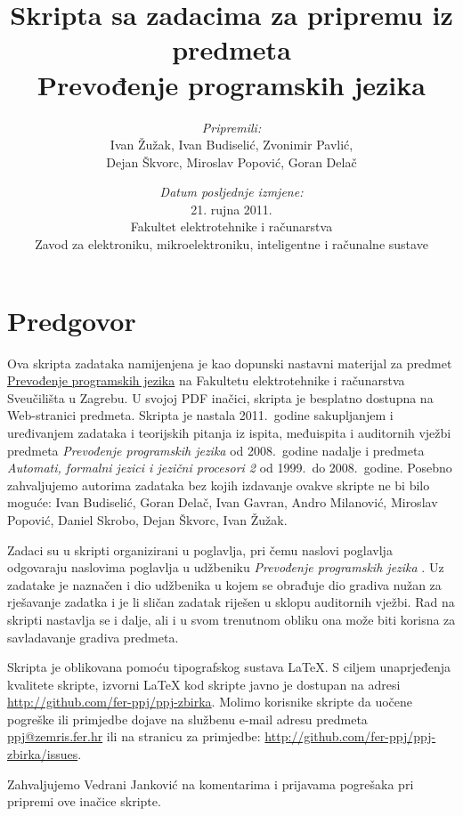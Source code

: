\documentclass[times, 12pt, utf8]{book}
\title{
\vfill
Skripta sa zadacima za pripremu iz predmeta \\
Prevođenje programskih jezika \\
\vspace{70pt}
}
\author{
\emph{Pripremili:} \\
Ivan Žužak, Ivan Budiselić, Zvonimir Pavlić, \\
Dejan Škvorc, Miroslav Popović, Goran Delač \\}
\date{
\vspace{30pt} 
\emph{Datum posljednje izmjene:} \\
21. rujna 2011.\\
\vfill
Fakultet elektrotehnike i računarstva \\
Zavod za elektroniku, mikroelektroniku, inteligentne i računalne sustave
}
\begin{document}
\maketitle

\let\cleardoublepage\clearpage

\tableofcontents


\chapter*{Predgovor}

\begin{spacing}{1.5}
Ova skripta zadataka namijenjena je kao dopunski nastavni materijal za predmet \href{http://www.fer.unizg.hr/predmet/ppj_a}{Prevođenje programskih jezika} na Fakultetu elektrotehnike i računarstva Sveučilišta u Zagrebu. 
U svojoj PDF inačici, skripta je besplatno dostupna na Web-stranici predmeta.
Skripta je nastala 2011.~godine sakupljanjem i uređivanjem zadataka i teorijskih pitanja iz ispita, međuispita i auditornih vježbi predmeta \emph{Prevođenje programskih jezika} od 2008.~godine nadalje i predmeta \emph{Automati, formalni jezici i jezični procesori 2} od 1999.~do 2008.~godine.
Posebno zahvaljujemo autorima zadataka bez kojih izdavanje ovakve skripte ne bi bilo moguće:
Ivan Budiselić,
Goran Delač,
Ivan Gavran,
Andro Milanović,
Miroslav Popović,
Daniel Skrobo,
Dejan Škvorc,
Ivan Žužak.

Zadaci su u skripti organizirani u poglavlja, pri čemu naslovi poglavlja odgovaraju naslovima poglavlja u udžbeniku \emph{Prevođenje programskih jezika} \cite{udzbenik}.
Uz zadatake je naznačen i dio udžbenika u kojem se obrađuje dio gradiva nužan za rješavanje zadatka i je li sličan zadatak riješen u sklopu auditornih vježbi.
Rad na skripti nastavlja se i dalje, ali i u svom trenutnom obliku ona može biti korisna za savladavanje gradiva predmeta.

Skripta je oblikovana pomoću tipografskog sustava \LaTeX{}.
S ciljem unaprjeđenja kvalitete skripte, izvorni \LaTeX{} kod skripte javno je dostupan na adresi \url{http://github.com/fer-ppj/ppj-zbirka}.
Molimo korisnike skripte da uočene pogreške ili primjedbe dojave na službenu e-mail adresu predmeta \href{mailto:ppj@zemris.fer.hr}{ppj@zemris.fer.hr} ili na stranicu za primjedbe: \url{http://github.com/fer-ppj/ppj-zbirka/issues}. 

Zahvaljujemo Vedrani Janković na komentarima i prijavama pogrešaka pri pripremi ove inačice skripte.
\end{spacing}
\end{document}

